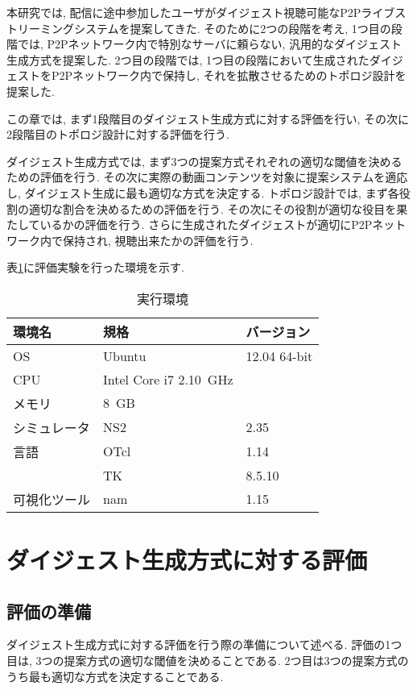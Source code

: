 本研究では,  配信に途中参加したユーザがダイジェスト視聴可能なP2Pライブストリーミングシステムを提案してきた. そのために2つの段階を考え, 1つ目の段階では, P2Pネットワーク内で特別なサーバに頼らない, 汎用的なダイジェスト生成方式を提案した. 2つ目の段階では, 1つ目の段階において生成されたダイジェストをP2Pネットワーク内で保持し, それを拡散させるためのトポロジ設計を提案した.

この章では, まず1段階目のダイジェスト生成方式に対する評価を行い, その次に2段階目のトポロジ設計に対する評価を行う.

ダイジェスト生成方式では, まず3つの提案方式それぞれの適切な閾値を決めるための評価を行う. その次に実際の動画コンテンツを対象に提案システムを適応し, ダイジェスト生成に最も適切な方式を決定する. トポロジ設計では, まず各役割の適切な割合を決めるための評価を行う. その次にその役割が適切な役目を果たしているかの評価を行う. さらに生成されたダイジェストが適切にP2Pネットワーク内で保持され, 視聴出来たかの評価を行う.

表\ref{tbl:env}に評価実験を行った環境を示す.

\begin{table}[h]
  \caption{実行環境}
  \label{tbl:env}
  \centering
      {\small
        \begin{tabular}{|l|l|l|} \hline
          環境名 & 規格 & バージョン \\ \hline \hline
          OS & Ubuntu & 12.04 64-bit  \\ \hline
          CPU & Intel Core i7 2.10~GHz & \\ \hline
          メモリ & 8~GB & \\ \hline
          シミュレータ & NS2 & 2.35 \\ \hline
          言語 & OTcl & 1.14 \\ \cline{2-3}
           & TK & 8.5.10 \\ \hline
          可視化ツール & nam & 1.15 \\ \hline
        \end{tabular}
      }
\end{table}

\section{ダイジェスト生成方式に対する評価}
\subsection{評価の準備}
ダイジェスト生成方式に対する評価を行う際の準備について述べる. 評価の1つ目は, 3つの提案方式の適切な閾値を決めることである. 2つ目は3つの提案方式のうち最も適切な方式を決定することである.

